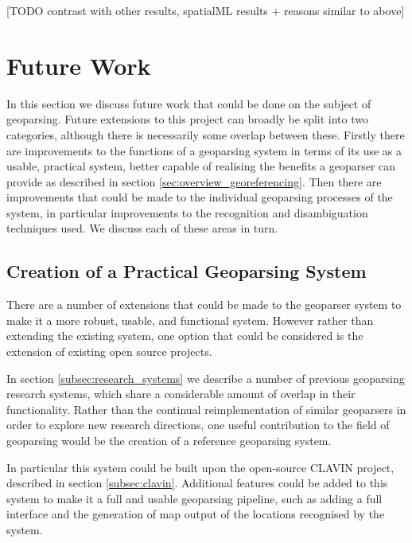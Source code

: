\documentclass[12pt, a4paper]{report}
\begin{document}
[TODO contrast with other results, spatialML results + reasons similar to above]





\section{Future Work}

In this section we discuss future work that could be done on the subject of geoparsing. Future extensions to this project can broadly be split into two categories, although there is necessarily some overlap between these. Firstly there are improvements to the functions of a geoparsing system in terms of its use as a usable, practical system, better capable of realising the benefits a geoparser can provide as described in section \ref{sec:overview_georeferencing}. Then there are improvements that could be made to the individual geoparsing processes of the system, in particular improvements to the recognition and disambiguation techniques used. We discuss each of these areas in turn.

\subsection{Creation of a Practical Geoparsing System}

There are a number of extensions that could be made to the geoparser system to make it a more robust, usable, and functional system. However rather than extending the existing system, one option that could be considered is the extension of existing open source projects.

In section \ref{subsec:research_systems} we describe a number of previous geoparsing research systems, which share a considerable amount of overlap in  their functionality. Rather than the continual reimplementation of similar geoparsers in order to explore new research directions, one useful contribution to the field of geoparsing would be the creation of a reference geoparsing system.

In particular this system could be built upon the open-source CLAVIN project, described in section \ref{subsec:clavin}. Additional features could be added to this system to make it a full and usable geoparsing pipeline, such as adding a full interface and the generation of map output of the locations recognised by the system. 
\end{document}
